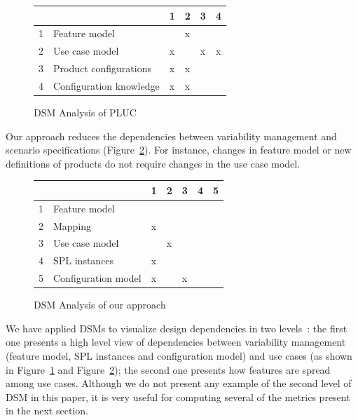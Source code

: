 \documentclass[times, 11pt,twocolumn]{article}
\begin{document}
\begin{figure}[htb]
\centering
\begin{small}
\begin{tabular}{llllll} \hline
&  & 1 & 2 & 3 & 4 \\ \hline
1 & Feature model 			& 	& x	& 	&   	\\ 
2 & Use case model 		& x 	&  	&  x	&  x  \\ 
3 & Product configurations	& x 	& x	& 	&    	\\
4 & Configuration knowledge 	& x 	& x 	& 	&    	\\ \hline
\end{tabular}
\end{small}
 \caption{DSM Analysis of PLUC}
\label{dsm:pluc}
\end{figure}

Our approach reduces the dependencies between variability management and scenario
specifications (Figure~\ref{dsm:cc}). For instance, changes in feature model or
new definitions of products do not require changes in the use case model. 

\begin{figure}[h]
\centering
\begin{small}
\begin{tabular}{lllllll} \hline
& & 1 & 2 & 3 & 4 & 5 \\ \hline
1 & Feature model 		& 	& 	&      &  	&  	\\ 
2 & Mapping	 		& x	&	&	&	&  	\\
3 & Use case model 	&  	&  x	&  	&  	& 	\\
4 & SPL instances 		& x 	& 	& 	&   	& 	\\
5 & Configuration model 	& x 	&  	&  x	&  	& 	\\  \hline
\end{tabular}
\end{small}
 \caption{DSM Analysis of our approach}
\label{dsm:cc}
\end{figure}   

We have applied DSMs to visualize design dependencies in two
levels~\cite{Bonifacio:2008aa}: the first one presents a high level view of dependencies between variability management
(feature model, SPL instances and configuration model) and use cases (as shown in
Figure~\ref{dsm:pluc} and Figure~\ref{dsm:cc}); the second one presents how
features are spread among use cases. Although we do not present any example of
the second level of DSM in this paper, it is very useful for computing several
of the metrics present in the next section.
\end{document}
